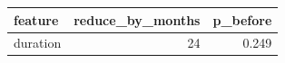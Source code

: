 \begin{tabular}{lrr}
\toprule
feature & reduce_by_months & p_before \\
\midrule
duration & 24 & 0.249 \\
\bottomrule
\end{tabular}
